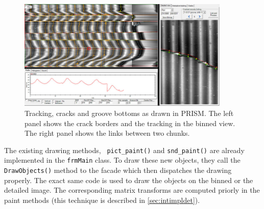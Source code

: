 \begin{figure}[!ht]
\centering
\includegraphics[width=0.9\textwidth]{images/prism-draw-ex}
\caption[Tracking, cracks and groove bottoms as drawn in PRISM.]
{Tracking, cracks and groove bottoms as drawn in PRISM. The left panel shows the crack borders and the tracking in the binned view. The right panel shows the links between two chunks.}
\label{fig:prismdrawex}
\end{figure}

The existing drawing methods, \texttt{ pict\_paint()} and \texttt{snd\_paint()} are already implemented in the \texttt{frmMain} class. To draw these new objects, they call the \texttt{DrawObjects()} method to the facade which then dispatches the drawing properly. The exact same code is used to draw the objects on the binned or the detailed image. The corresponding matrix transforms are computed priorly in the paint methods (this technique is described in \autoref{sec:intimpldet}).


%
%

%
%
%
%
%
%

